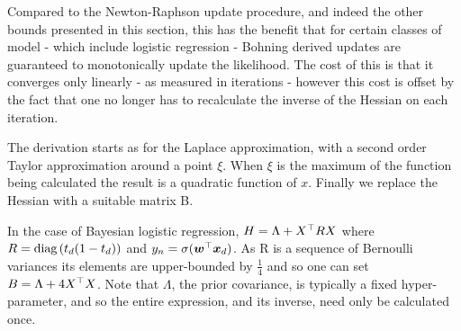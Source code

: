 Compared to the Newton-Raphson update procedure, and indeed the other bounds presented in this section, this has the benefit that for certain classes of model - which include logistic regression - Bohning derived updates are guaranteed to monotonically update the likelihood. The cost of this is that it converges only linearly - as measured in iterations - however this cost is offset by the fact that one no longer has to recalculate the inverse of the Hessian on each iteration.

The derivation starts as for the Laplace approximation, with a second order Taylor approximation around a point $\xi$. When $\xi$ is the maximum of the function being calculated the result is a quadratic function of $x$. Finally we replace the Hessian with a suitable matrix B.

%

In the case of Bayesian logistic regression, $H = \Lambda + X^\top R X$ where $R = \text{diag} \left( {t_d (1-t_d)} \right)$ and $y_n = \sigma(\bm w^\top\bm x_d)$. As R is a sequence of Bernoulli variances its elements are upper-bounded by $\frac{1}{4}$ and so one can set $B = \Lambda + 4 X^\top X$. Note that $\Lambda$, the prior covariance, is typically a fixed hyper-parameter, and so the entire expression, and its inverse, need only be calculated once.


